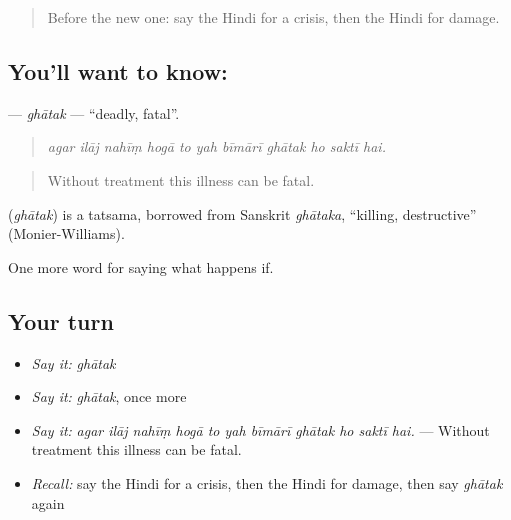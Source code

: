 \label{lesson:HI-C383-ghatak}



\begin{quote}
Before the new one: say the Hindi for a crisis, then the Hindi for damage.
\end{quote}

\subsection*{You'll want to know: }
\textbf{} — \emph{ghātak} — \textquotedblleft{}deadly, fatal\textquotedblright{}.

\begin{quote}
          
\end{quote}

\begin{quote}
\emph{agar ilāj nahīṃ hogā to yah bīmārī ghātak ho saktī hai.}
\end{quote}

\begin{quote}
Without treatment this illness can be fatal.
\end{quote}

\begin{cousinweb}
\textbf{} (\emph{ghātak}) is a tatsama, borrowed from Sanskrit \emph{ghātaka}, \textquotedblleft{}killing, destructive\textquotedblright{} (Monier-Williams).
\end{cousinweb}

\begin{grammarlens}[title={What you've built}]
One more word for saying what happens if.
\end{grammarlens}

\subsection*{Your turn}
\begin{itemize}
\raggedright
  \item \emph{Say it:} \emph{ghātak}
  \item \emph{Say it:} \emph{ghātak}, once more
  \item \emph{Say it:} \emph{agar ilāj nahīṃ hogā to yah bīmārī ghātak ho saktī hai.} — Without treatment this illness can be fatal.
  \item \emph{Recall:} say the Hindi for a crisis, then the Hindi for damage, then say \emph{ghātak} again
\end{itemize}


